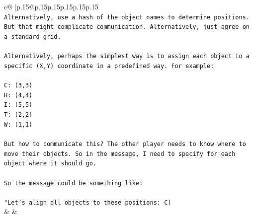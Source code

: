 \documentclass{article}
\begin{document}
{\begin{supertabular}{c@{$\;$}|p{.15\linewidth}@{}p{.15\linewidth}p{.15\linewidth}p{.15\linewidth}p{.15\linewidth}p{.15\linewidth}}
{{{\\ 
\texttt{Alternatively, use a hash of the object names to determine positions. But that might complicate communication. Alternatively, just agree on a standard grid.} \\
\\ 
\texttt{Alternatively, perhaps the simplest way is to assign each object to a specific (X,Y) coordinate in a predefined way. For example:} \\
\\ 
\texttt{C: (3,3)} \\
\texttt{H: (4,4)} \\
\texttt{I: (5,5)} \\
\texttt{T: (2,2)} \\
\texttt{W: (1,1)} \\
\\ 
\texttt{But how to communicate this? The other player needs to know where to move their objects. So in the message, I need to specify for each object where it should go.} \\
\\ 
\texttt{So the message could be something like:} \\
\\ 
\texttt{"Let's align all objects to these positions: C(} \\
            }
        }
    }
    & & \\ \\


\end{supertabular}}
\end{document}

